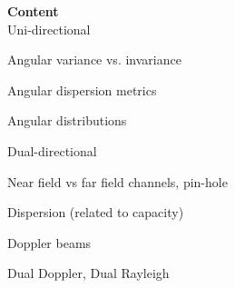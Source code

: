 \textbf{Content} \\

Uni-directional

\begin{pitemize}
 \item Angular variance vs. invariance
\item Angular dispersion metrics
\item Angular distributions
\end{pitemize}

Dual-directional
 \begin{pitemize}
\item Near field vs far field channels, pin-hole
\item Dispersion (related to capacity)
\item Doppler beams
\item Dual Doppler, Dual Rayleigh
\end{pitemize}